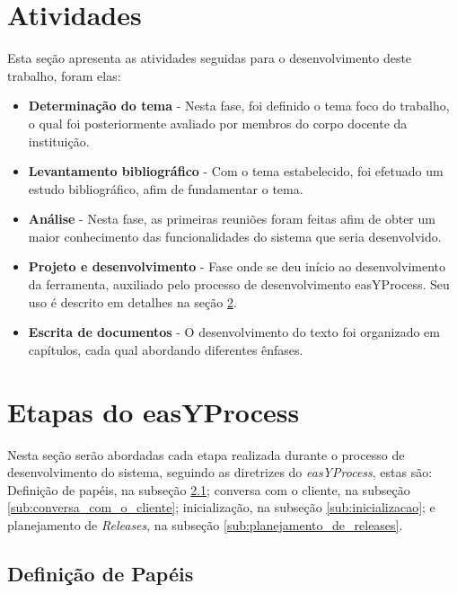 \documentclass[a4paper,12pt]{monografia}
\begin{document}
\section{Atividades} %
\label{sec:atividades}

Esta seção apresenta as atividades seguidas para o desenvolvimento deste trabalho, foram elas:

\begin{itemize}
\item \textbf{Determinação do tema} - Nesta fase, foi definido o tema foco do trabalho, o qual foi posteriormente avaliado por membros do corpo docente da instituição.

\item \textbf{Levantamento bibliográfico} - Com o tema estabelecido, foi efetuado um estudo bibliográfico, afim de fundamentar o tema.

\item \textbf{Análise} - Nesta fase, as primeiras reuniões foram feitas afim de obter um maior conhecimento das funcionalidades do sistema que seria desenvolvido.

\item \textbf{Projeto e desenvolvimento} - Fase onde se deu início ao desenvolvimento da ferramenta, auxiliado pelo processo de desenvolvimento easYProcess. Seu uso é descrito em detalhes na seção \ref{sec:processo_de_desenvolvimento}.

\item \textbf{Escrita de documentos} - O desenvolvimento do texto foi organizado em capítulos, cada qual abordando diferentes ênfases.

\end{itemize}

\section{Etapas do easYProcess} %
\label{sec:processo_de_desenvolvimento}

Nesta seção serão abordadas cada etapa realizada durante o processo de desenvolvimento do sistema, seguindo as diretrizes do \textit{easYProcess}, estas são: Definição de papéis, na subseção \ref{sub:definicao_de_papeis}; conversa com o cliente, na subseção \ref{sub:conversa_com_o_cliente}; inicialização, na subseção \ref{sub:inicializacao}; e planejamento de \textit{Releases}, na subseção \ref{sub:planejamento_de_releases}.

\subsection{Definição de Papéis} %
\label{sub:definicao_de_papeis}
\end{document}
